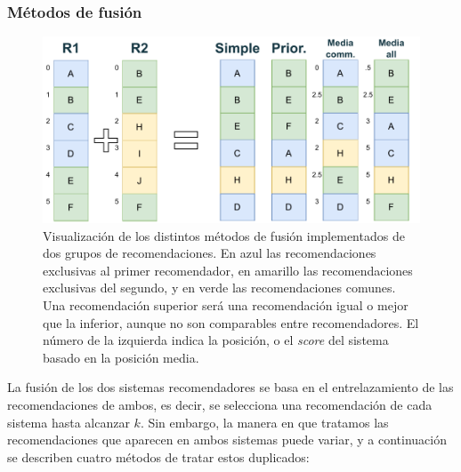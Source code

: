 \subsubsection{Métodos de fusión}

\begin{figure}[bth]
    \centering
    \includegraphics[width=\linewidth]{figures/04_implementacion/metodos-fusion.drawio.pdf}
    \caption[Visualización de los distintos métodos de fusión implementados de dos grupos de recomendaciones.]{Visualización de los distintos métodos de fusión implementados de dos grupos de recomendaciones. En azul las recomendaciones exclusivas al primer recomendador, en amarillo las recomendaciones exclusivas del segundo, y en verde las recomendaciones comunes. Una recomendación superior será una recomendación igual o mejor que la inferior, aunque no son comparables entre recomendadores. El número de la izquierda indica la posición, o el \textit{score} del sistema basado en la posición media.}
    \label{fig:metodos-fusion}
\end{figure}


La fusión de los dos sistemas recomendadores se basa en el entrelazamiento de las recomendaciones de ambos, es decir, se selecciona una recomendación de cada sistema hasta alcanzar $k$. Sin embargo, la manera en que tratamos las recomendaciones que aparecen en ambos sistemas puede variar, y a continuación se describen cuatro métodos de tratar estos duplicados:


